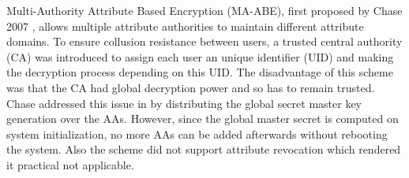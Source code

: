 \documentclass[twocolumn]{article}
\begin{document}
Multi-Authority Attribute Based Encryption (MA-ABE), first proposed by Chase 2007 \cite{chase2007multi}, allows multiple attribute authorities to maintain different attribute domains. To ensure collusion resistance between users, a trusted  central authority (CA) was introduced to assign each user an unique identifier (UID) and making the decryption process depending on this UID. The disadvantage of this scheme was that the CA had global decryption power and so has to remain trusted. 
Chase addressed this issue in \cite{chase2009improving} by distributing the global secret  master key generation over the AAs. However, since the global master secret is computed on system initialization, no more AAs can be added afterwards without rebooting the system. Also the scheme did not support attribute revocation which rendered it practical not applicable.

\end{document}
